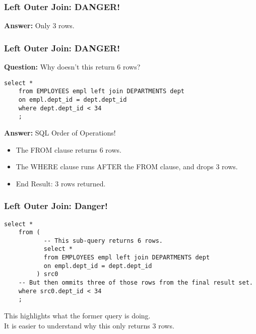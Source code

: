 \documentclass{beamer}
\begin{document}
\begin{frame}
  \frametitle{Left Outer Join: DANGER!}
  {\huge \textbf{Answer: }Only 3 rows.}

\end{frame}

\begin{frame}[fragile]
  \frametitle{Left Outer Join: DANGER!}
    \textbf{Question:} Why doesn't this return 6 rows?
  \bigskip

  \begin{lstlisting}[title={\tiny Source: https://github.com/Choens/sql-survival-guide/blob/master/sql/04-joins/left-join.sql}]
    select *
    from EMPLOYEES empl left join DEPARTMENTS dept
    on empl.dept_id = dept.dept_id
    where dept.dept_id < 34
    ;
  \end{lstlisting}
  
  \bigskip
  \pause 
  \textbf{Answer:} SQL Order of Operations!
  \begin{itemize}
  \item The FROM clause returns 6 rows.
  \item The WHERE clause runs AFTER the FROM clause, and drops 3 rows.
  \item End Result: 3 rows returned.
  \end{itemize}

\end{frame}

\begin{frame}[fragile]
  \frametitle{Left Outer Join: Danger!}

  \begin{lstlisting}[title={\tiny Source:
      https://github.com/Choens/sql-survival-guide/blob/master/sql/04-joins/left-join.sql}]
    select *
    from (
           -- This sub-query returns 6 rows.
           select *
           from EMPLOYEES empl left join DEPARTMENTS dept
           on empl.dept_id = dept.dept_id
         ) src0
    -- But then ommits three of those rows from the final result set.     
    where src0.dept_id < 34
    ;
  \end{lstlisting}

  \bigskip
  This highlights what the former query is doing. \\
  It is easier to understand why this only returns 3 rows.

\end{frame}
\end{document}

